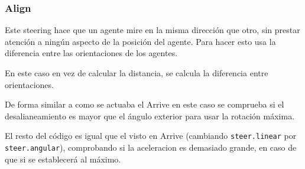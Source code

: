 \subsubsection{Align}

Este steering hace que un agente mire en la misma dirección que otro, sin prestar atención a ningún aspecto de la posición del agente. Para hacer esto usa la diferencia entre las orientaciones de los agentes.

En este caso en vez de calcular la distancia, se calcula la diferencia entre orientaciones.



De forma similar a como se actuaba el Arrive en este caso se comprueba si el desalianeamiento es mayor que el ángulo exterior para usar la rotación máxima.



El resto del código es igual que el visto en Arrive (cambiando \texttt{steer.linear} por \texttt{steer.angular}), comprobando si la aceleracion es demasiado grande, en caso de que si se establecerá al máximo.
